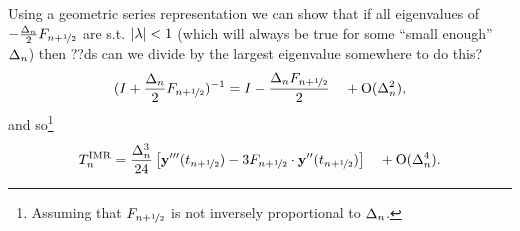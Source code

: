 Using a geometric series representation we can show that if all eigenvalues of  $-\frac{\dtn}{2}\dfdyhf$ are s.t. $\abs{\lambda} < 1$\cite{??ds} (which will always be true for some ``small enough'' $\dtn$) then
??ds can we divide by the largest eigenvalue somewhere to do this?
\begin{equation}
  (I + \frac{\dtn}{2}\dfdyhf)^{-1} = I - \frac{\dtn \dfdyhf}{2}  \porder{\dtn^2},
\end{equation}
and so\footnote{Assuming that $\dfdyhf$ is not inversely proportional to $\dtn$.}
\begin{equation}
  \lte^\imr = \frac{\dtn^3}{24} \left[\yvhf['''] - 3 \dfdyhf \cdot \yvhf[''] \right]
  \quad +\order{\dtn^4}.
\end{equation}

